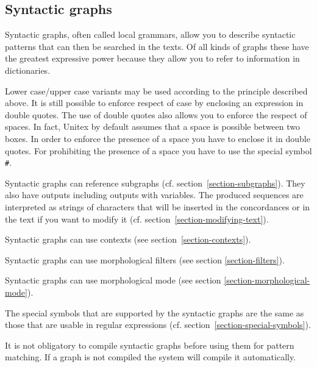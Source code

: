 \subsection{Syntactic graphs}
\label{syntactic-graphs}
Syntactic graphs, often called local grammars, allow you to describe syntactic
patterns that can then be searched in the texts. Of all kinds of graphs these
have the greatest expressive power because they allow you to refer to information
in dictionaries. 

\bigskip
\noindent Lower case/upper case variants may be used according to the principle described
above. It is still possible to enforce respect of case by enclosing an
expression in double quotes. The use of double quotes also allows you to enforce
the respect of spaces. In fact, Unitex by default assumes that a space is possible between two
boxes. In order to enforce the presence of a space you have to enclose it in
double quotes. For prohibiting the presence of a space you have to use the
special symbol \verb+#+.\index{\verb+#+}

\bigskip
\noindent Syntactic graphs can reference subgraphs (cf.
section~\ref{section-subgraphs}). They also have outputs including outputs
with variables. The produced sequences are interpreted as strings of characters
that will be inserted in the concordances or in the text if you want to modify it
(cf. section~\ref{section-modifying-text}).

\bigskip
\noindent Syntactic graphs can use contexts (see section~\ref{section-contexts}).

\bigskip
\noindent Syntactic graphs can use morphological filters (see section
\ref{section-filters}).

\bigskip
\noindent Syntactic graphs can use morphological mode (see section
\ref{section-morphological-mode}).

\bigskip
\noindent The special symbols that are supported by the syntactic graphs are the same as those that
are usable in regular expressions (cf.
section~\ref{section-special-symbols}).

\bigskip
\noindent It is not obligatory to compile syntactic graphs before using them for
pattern matching. If a graph is not compiled the system will compile it
automatically.

